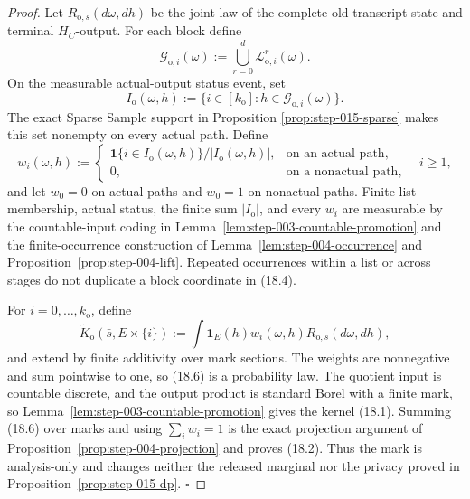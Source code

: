 \begin{proof}
Let \(R_{\mathrm o,\bar s}(d\omega,dh)\) be the joint law of the complete
old transcript state and terminal \(H_C\)-output. For each block define
\[
\mathcal G_{\mathrm o,i}(\omega):=
\bigcup_{r=0}^d\mathcal L_{\mathrm o,i}^r(\omega).
\tag{18.3}
\]
On the measurable actual-output status event, set
\[
I_{\mathrm o}(\omega,h):=
\{i\in[k_{\mathrm o}]:h\in\mathcal G_{\mathrm o,i}(\omega)\}.
\tag{18.4}
\]
The exact Sparse Sample support in Proposition
\ref{prop:step-015-sparse} makes this set nonempty on every actual path.
Define
\[
w_i(\omega,h):=
\begin{cases}
\mathbf1\{i\in I_{\mathrm o}(\omega,h)\}/|I_{\mathrm o}(\omega,h)|,
&\text{on an actual path},\\
0,&\text{on a nonactual path},
\end{cases}
\quad i\ge1,
\tag{18.5}
\]
and let \(w_0=0\) on actual paths and \(w_0=1\) on nonactual paths.
Finite-list membership, actual status, the finite sum
\(|I_{\mathrm o}|\), and every \(w_i\) are measurable by the
countable-input coding in Lemma~\ref{lem:step-003-countable-promotion} and
the finite-occurrence construction of Lemma~\ref{lem:step-004-occurrence}
and Proposition~\ref{prop:step-004-lift}.
Repeated occurrences within a list or across stages do not duplicate a
block coordinate in (18.4).

For \(i=0,\ldots,k_{\mathrm o}\), define
\[
\widetilde K_{\mathrm o}(\bar s,E\times\{i\})
:=\int\mathbf1_E(h)w_i(\omega,h)
R_{\mathrm o,\bar s}(d\omega,dh),
\tag{18.6}
\]
and extend by finite additivity over mark sections. The weights are
nonnegative and sum pointwise to one, so (18.6) is a probability law.
The quotient input is countable discrete, and the output product is
standard Borel with a finite mark, so
Lemma~\ref{lem:step-003-countable-promotion} gives the kernel (18.1).
Summing (18.6) over marks and using \(\sum_iw_i=1\) is the exact projection
argument of Proposition~\ref{prop:step-004-projection} and proves (18.2).
Thus the mark is analysis-only and changes
neither the released marginal nor the privacy proved in
Proposition~\ref{prop:step-015-dp}. \(\square\)


\end{proof}

